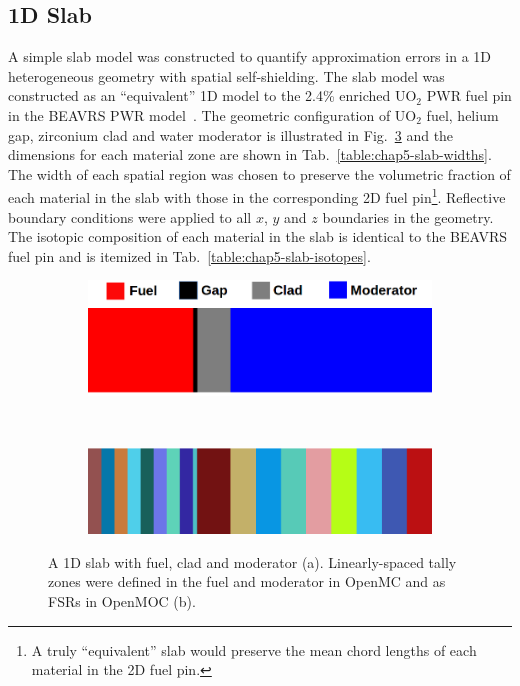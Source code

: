 \subsection{1D Slab}
\label{subsec:chap5-slab}

A simple slab model was constructed to quantify approximation errors in a 1D heterogeneous geometry with spatial self-shielding. The slab model was constructed as an ``equivalent'' 1D model to the 2.4\% enriched UO$_2$ \ac{PWR} fuel pin in the \ac{BEAVRS} \ac{PWR} model~\cite{horelik2013beavrs}. The geometric configuration of UO$_2$ fuel, helium gap, zirconium clad and water moderator is illustrated in Fig.~\ref{fig:chap5-slab} and the dimensions for each material zone are shown in Tab.~\ref{table:chap5-slab-widths}. The width of each spatial region was chosen to preserve the volumetric fraction of each material in the slab with those in the corresponding 2D fuel pin\footnote{A truly ``equivalent'' slab would preserve the mean chord lengths of each material in the 2D fuel pin.}. Reflective boundary conditions were applied to all $x$, $y$ and $z$ boundaries in the geometry. The isotopic composition of each material in the slab is identical to the \ac{BEAVRS} fuel pin and is itemized in Tab.~\ref{table:chap5-slab-isotopes}. 

\begin{figure}[h!]
\begin{subfigure}{\textwidth}
  \centering
  \includegraphics[width=0.7\linewidth]{figures/biases/slab/slab-simple-labels}
  \caption{}
  \label{fig:chap5-slab-a}
\end{subfigure} \\
\begin{subfigure}{\textwidth}
  \centering
  \includegraphics[width=0.7\linewidth]{figures/biases/slab/slab-8x}
  \caption{}
  \label{fig:chap5-slab-b}
\end{subfigure}
\caption[1D slab materials and geometry]{A 1D slab with fuel, clad and moderator (a). Linearly-spaced tally zones were defined in the fuel and moderator in OpenMC and as \ac{FSR}s in OpenMOC (b).}
\label{fig:chap5-slab}
\end{figure}

